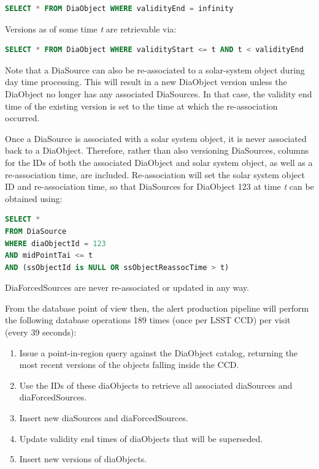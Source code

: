 \documentclass[DM,lsstdraft,toc]{lsstdoc}
\begin{document}
\begin{lstlisting}[language=SQL]
SELECT * FROM DiaObject WHERE validityEnd = infinity
\end{lstlisting}

Versions as of some time \emph{t} are retrievable via:

\begin{lstlisting}[language=SQL]
SELECT * FROM DiaObject WHERE validityStart <= t AND t < validityEnd
\end{lstlisting}

Note that a DiaSource can also be re-associated to a solar-system object
during day time processing. This will result in a new DiaObject version unless
the DiaObject no longer has any associated DiaSources. In that case, the
validity end time of the existing version is set to the time at which the re-association
occurred.

Once a DiaSource is associated with a solar system object, it is never
associated back to a DiaObject. Therefore, rather than also versioning
DiaSources, columns for the IDs of both the associated DiaObject and solar
system object, as well as a re-association time, are included. Re-association
will set the solar system object ID and re-association time, so that
DiaSources for DiaObject 123 at time \emph{t} can be obtained using:

\begin{lstlisting}[language=SQL]
SELECT *
FROM DiaSource
WHERE diaObjectId = 123
AND midPointTai <= t
AND (ssObjectId is NULL OR ssObjectReassocTime > t)
\end{lstlisting}

DiaForcedSources are never re-associated or updated in any way.

From the database point of view then, the alert production pipeline will
perform the following database operations 189 times (once per LSST CCD) per
visit (every 39 seconds):

\begin{enumerate}
\def\labelenumi{\arabic{enumi}.}
\item
  Issue a point-in-region query against the DiaObject catalog, returning
  the most recent versions of the objects falling inside the CCD.
\item
  Use the IDs of these diaObjects to retrieve all associated diaSources
  and diaForcedSources.
\item
  Insert new diaSources and diaForcedSources.
\item
  Update validity end times of diaObjects that will be superseded.
\item
  Insert new versions of diaObjects.
\end{enumerate}
\end{document}
